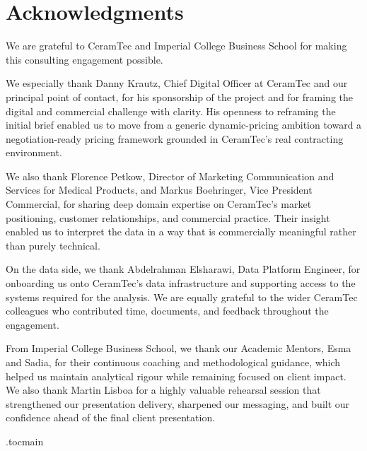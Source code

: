 \documentclass{article}
\begin{document}
\clearpage

\section*{Acknowledgments}

We are grateful to CeramTec and Imperial College Business School for making this consulting engagement possible.

\vspace{0.4cm}

We especially thank Danny Krautz, Chief Digital Officer at CeramTec and our principal point of contact, for his sponsorship of the project and for framing the digital and commercial challenge with clarity. His openness to reframing the initial brief enabled us to move from a generic dynamic-pricing ambition toward a negotiation-ready pricing framework grounded in CeramTec's real contracting environment.

\vspace{0.4cm}

We also thank Florence Petkow, Director of Marketing Communication and Services for Medical Products, and Markus Boehringer, Vice President Commercial, for sharing deep domain expertise on CeramTec's market positioning, customer relationships, and commercial practice. Their insight enabled us to interpret the data in a way that is commercially meaningful rather than purely technical.

\vspace{0.4cm}

On the data side, we thank Abdelrahman Elsharawi, Data Platform Engineer, for onboarding us onto CeramTec's data infrastructure and supporting access to the systems required for the analysis. We are equally grateful to the wider CeramTec colleagues who contributed time, documents, and feedback throughout the engagement.

\vspace{0.4cm}

From Imperial College Business School, we thank our Academic Mentors, Esma and Sadia, for their continuous coaching and methodological guidance, which helped us maintain analytical rigour while remaining focused on client impact. We also thank Martin Lisboa for a highly valuable rehearsal session that strengthened our presentation delivery, sharpened our messaging, and built our confidence ahead of the final client presentation.


\clearpage
\etocdepthtag.toc{main}
\end{document}
